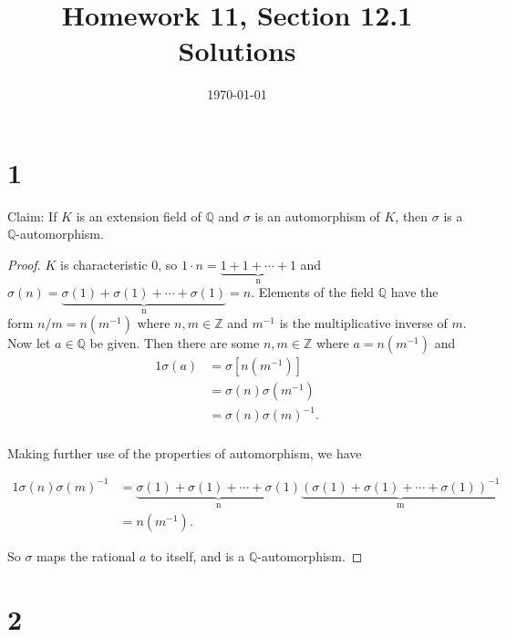 \documentclass{article}
\title{\textbf{Homework 11, Section 12.1 Solutions}}
\date{}
\date\today
\begin{document}
\maketitle %

\thispagestyle{firstpage}
\section*{1}

Claim: If $K$ is an extension field of $\mathbb{Q}$ and $\sigma$ is an automorphism of $K$, then 
$\sigma$ is a $\mathbb{Q}$-automorphism.

\begin{proof}
    $K$ is characteristic $0$, so $1 \cdot n = \underbrace{1 + 1 + \cdots + 1}_\text{n}$ and 
    $\sigma(n) = \underbrace{\sigma(1) + \sigma(1) + \cdots + \sigma(1)}_\text{n} = n$.  
    Elements of the field $\mathbb{Q}$ have the form $n/m = n(m^{-1})$ where $n, m \in \mathbb{Z}$ and  
    $m^{-1}$ is the multiplicative inverse of $m$.  \\ 

    Now let $a \in \mathbb{Q}$ be given.  Then there are some $n, m \in \mathbb{Z}$ where 
    $a = n(m^{-1})$ and 
    \begin{alignat*}{1}
      \sigma(a) &= \sigma[n(m^{-1})] \\ 
      &= \sigma(n)\sigma(m^{-1}) \\ 
      &= \sigma(n)\sigma(m)^{-1}. \\ 
    \end{alignat*}

    Making further use of the properties of automorphism, we have 

    \begin{alignat*}{1}
      \sigma(n)\sigma(m)^{-1} &= \underbrace{\sigma(1) + \sigma(1) + \cdots + \sigma(1)}_\text{n} \underbrace{(\sigma(1) + \sigma(1) + \cdots + \sigma(1))^{-1}}_\text{m} \\ 
      &= n(m^{-1}).
    \end{alignat*}

    So $\sigma$ maps the rational $a$ to itself, and is a $\mathbb{Q}$-automorphism.

\end{proof}


\section*{2} 
\end{document}

